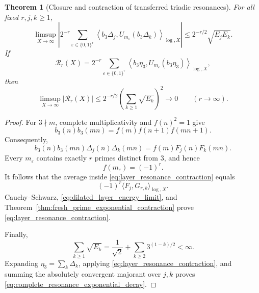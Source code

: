 \documentclass[11pt]{amsart}
\numberwithin{equation}{section}
\theoremstyle{plain}
\newtheorem{theorem}{Theorem}[section]
\theoremstyle{definition}
\theoremstyle{remark}
\begin{document}
\begin{theorem}[Closure and contraction of transferred triadic resonances]
\label{thm:transferred_triadic_resonance_contraction}
For all fixed $r,j,k\geq1$,
\begin{equation}
\limsup_{X\to\infty}
\left|
2^{-r}
\sum_{\varepsilon\in\{0,1\}^r}
\left\langle
b_3\Delta_j,
U_{m_\varepsilon}(b_3\Delta_k)
\right\rangle_{\log,X}
\right|
\leq
2^{-r/2}\sqrt{E_jE_k}.
\label{eq:layer_resonance_contraction}
\end{equation}
If
\begin{equation}
\mathcal R_r(X)
=
2^{-r}
\sum_{\varepsilon\in\{0,1\}^r}
\left\langle
b_3\eta_3,
U_{m_\varepsilon}(b_3\eta_3)
\right\rangle_{\log,X},
\label{eq:complete_transferred_resonance}
\end{equation}
then
\begin{equation}
\limsup_{X\to\infty}|\mathcal R_r(X)|
\leq
2^{-r/2}
\left(\sum_{k\geq1}\sqrt{E_k}\right)^2
\longrightarrow0
\qquad(r\to\infty).
\label{eq:complete_resonance_exponential_decay}
\end{equation}
\end{theorem}

\begin{proof}
For $3\nmid m$, complete multiplicativity and $f(n)^2=1$ give
\begin{equation}
b_3(n)b_3(mn)
=
f(m)f(n+1)f(mn+1).
\label{eq:residual_transfer_identity}
\end{equation}
Consequently,
\begin{equation}
b_3(n)b_3(mn)\Delta_j(n)\Delta_k(mn)
=
f(m)F_j(n)F_k(mn).
\label{eq:closed_layer_transfer_identity}
\end{equation}
Every $m_\varepsilon$ contains exactly $r$ primes distinct from $3$, and hence
\begin{equation}
f(m_\varepsilon)=(-1)^r.
\label{eq:branch_slope_sign}
\end{equation}
It follows that the average inside \eqref{eq:layer_resonance_contraction} equals
\begin{equation}
(-1)^r\langle F_j,G_{r,k}\rangle_{\log,X}.
\label{eq:closed_resonance_pairing}
\end{equation}
Cauchy--Schwarz, \eqref{eq:dilated_layer_energy_limit}, and Theorem~\ref{thm:fresh_prime_exponential_contraction} prove \eqref{eq:layer_resonance_contraction}.

Finally,
\begin{equation}
\sum_{k\geq1}\sqrt{E_k}
=
\frac1{\sqrt2}
+
\sum_{k\geq2}3^{(1-k)/2}
<\infty.
\label{eq:summable_triadic_shell_norms}
\end{equation}
Expanding $\eta_3=\sum_k\Delta_k$, applying \eqref{eq:layer_resonance_contraction}, and summing the absolutely convergent majorant over $j,k$ proves \eqref{eq:complete_resonance_exponential_decay}.
\end{proof}
\end{document}
